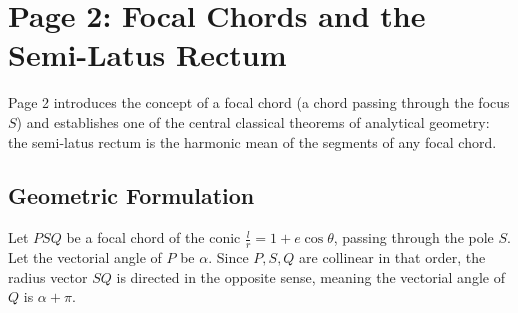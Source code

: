 \newpage
\section{Page 2: Focal Chords and the Semi-Latus Rectum}
\label{sec:page02}

\begin{conceptbox}
Page 2 introduces the concept of a focal chord (a chord passing through the focus $S$) and establishes one of the central classical theorems of analytical geometry: the semi-latus rectum is the harmonic mean of the segments of any focal chord.
\end{conceptbox}

\subsection{Geometric Formulation}
Let $PSQ$ be a focal chord of the conic $\frac{l}{r} = 1 + e\cos\theta$, passing through the pole $S$.
Let the vectorial angle of $P$ be $\alpha$. Since $P, S, Q$ are collinear in that order, the radius vector $SQ$ is directed in the opposite sense, meaning the vectorial angle of $Q$ is $\alpha + \pi$.

\begin{center}
\end{center}

